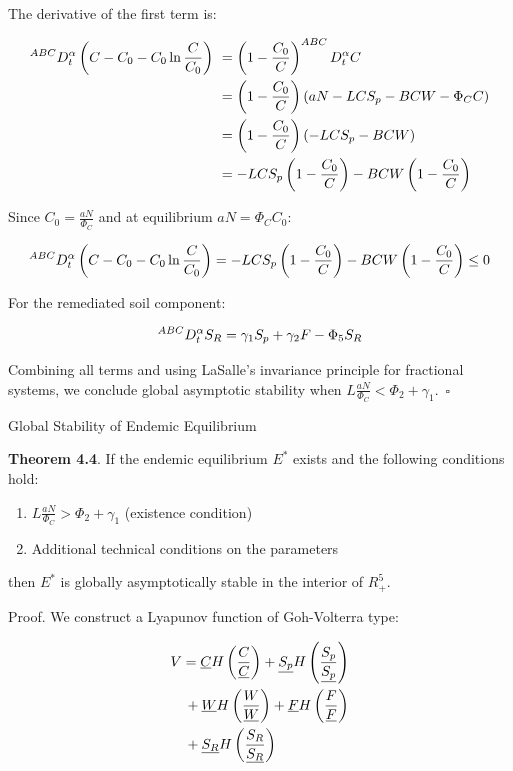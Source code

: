 \documentclass[10pt]{NSP1}
\newcommand{\fitwidth}[1]{\resizebox{\ifdim\width>\linewidth\linewidth\else\width\fi}{!}{#1}}
\begin{document}
The derivative of the first term is:

\[
\fitwidth{$\displaystyle \begin{aligned}
^{ABC}D_{t}^{\alpha}\left( C - C_{0} - C_{0}\ln\frac{C}{C_{0}} \right)\ &= \left( 1 - \frac{C_{0}}{C} \right)^{ABC}D_{t}^{\alpha}C \\
\ &= \left( 1 - \frac{C_{0}}{C} \right)\left( aN - LCS_{p} - BCW - \Phi_{C}C \right) \\
\ &= \left( 1 - \frac{C_{0}}{C} \right)\left( - LCS_{p} - BCW \right) \\
\ &= - LCS_{p}\left( 1 - \frac{C_{0}}{C} \right) - BCW\left( 1 - \frac{C_{0}}{C} \right)\
\end{aligned}$}
\]

Since \(C_{0} = \frac{aN}{\Phi_{C}}\) and at equilibrium \(aN = \Phi_{C}C_{0}\):

\[
\fitwidth{$\displaystyle ^{ABC}D_{t}^{\alpha}\left( C - C_{0} - C_{0}\ln\frac{C}{C_{0}} \right) = - LCS_{p}\left( 1 - \frac{C_{0}}{C} \right) - BCW\left( 1 - \frac{C_{0}}{C} \right) \leq 0$}
\]

For the remediated soil component:

\[
\fitwidth{$\displaystyle ^{ABC}D_{t}^{\alpha}S_{R} = \gamma_{1}S_{p} + \gamma_{2}F - \Phi_{5}S_{R}$}
\]

Combining all terms and using LaSalle's invariance principle for fractional systems, we conclude global asymptotic stability when \(L\frac{aN}{\Phi_{C}} < \Phi_{2} + \gamma_{1}\).~$\square$

Global Stability of Endemic Equilibrium

\textbf{Theorem 4.4}. If the endemic equilibrium \(E^{*}\) exists and the following conditions hold:

\begin{enumerate}
\def\labelenumi{\arabic{enumi}.}
\item
  \(L\frac{aN}{\Phi_{C}} > \Phi_{2} + \gamma_{1}\) (existence condition)
\item
  Additional technical conditions on the parameters
\end{enumerate}

then \(E^{*}\) is globally asymptotically stable in the interior of \(R_{+}^{5}\).

Proof. We construct a Lyapunov function of Goh-Volterra type:

\[
\fitwidth{$\displaystyle \begin{aligned}
&V = \underline{C}H\left( \frac{C}{\underline{C}} \right) + \underline{S_{p}}H\left( \frac{S_{p}}{\underline{S_{p}}} \right) \\
&\quad + \underline{W}H\left( \frac{W}{\underline{W}} \right) + \underline{F}H\left( \frac{F}{\underline{F}} \right) \\
&\quad + \underline{S_{R}}H\left( \frac{S_{R}}{\underline{S_{R}}} \right)
\end{aligned}$}
\]
\end{document}
